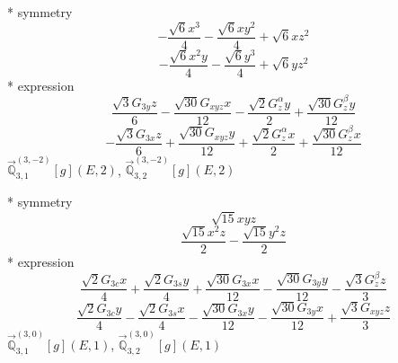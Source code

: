 \documentclass[fleqn,8pt]{jsarticle}
\begin{document}
\noindent\quad ** symmetry
\begin{dmath*}
- \frac{\sqrt{6} x^{3}}{4} - \frac{\sqrt{6} x y^{2}}{4} + \sqrt{6} x z^{2}
\end{dmath*}
\begin{dmath*}
- \frac{\sqrt{6} x^{2} y}{4} - \frac{\sqrt{6} y^{3}}{4} + \sqrt{6} y z^{2}
\end{dmath*}
\noindent\quad ** expression
\begin{dmath*}
\frac{\sqrt{3} G_{3y} z}{6} - \frac{\sqrt{30} G_{xyz} x}{12} - \frac{\sqrt{2} G_{z}^{\alpha} y}{2} + \frac{\sqrt{30} G_{z}^{\beta} y}{12}
\end{dmath*}
\begin{dmath*}
- \frac{\sqrt{3} G_{3x} z}{6} + \frac{\sqrt{30} G_{xyz} y}{12} + \frac{\sqrt{2} G_{z}^{\alpha} x}{2} + \frac{\sqrt{30} G_{z}^{\beta} x}{12}
\end{dmath*}
\noindent\quad $\vec{\mathbb{Q}}_{3,1}^{(3,-2)}[g](E,2)$, $\vec{\mathbb{Q}}_{3,2}^{(3,-2)}[g](E,2)$

\noindent\quad ** symmetry
\begin{dmath*}
\sqrt{15} x y z
\end{dmath*}
\begin{dmath*}
\frac{\sqrt{15} x^{2} z}{2} - \frac{\sqrt{15} y^{2} z}{2}
\end{dmath*}
\noindent\quad ** expression
\begin{dmath*}
\frac{\sqrt{2} G_{3c} x}{4} + \frac{\sqrt{2} G_{3s} y}{4} + \frac{\sqrt{30} G_{3x} x}{12} - \frac{\sqrt{30} G_{3y} y}{12} - \frac{\sqrt{3} G_{z}^{\beta} z}{3}
\end{dmath*}
\begin{dmath*}
\frac{\sqrt{2} G_{3c} y}{4} - \frac{\sqrt{2} G_{3s} x}{4} - \frac{\sqrt{30} G_{3x} y}{12} - \frac{\sqrt{30} G_{3y} x}{12} + \frac{\sqrt{3} G_{xyz} z}{3}
\end{dmath*}
\noindent\quad $\vec{\mathbb{Q}}_{3,1}^{(3,0)}[g](E,1)$, $\vec{\mathbb{Q}}_{3,2}^{(3,0)}[g](E,1)$
\end{document}

